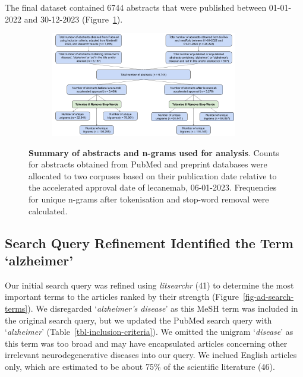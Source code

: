 \documentclass[
  a4paper,
]{article}
\begin{document}
The final dataset contained 6744 abstracts that were published between
01-01-2022 and 30-12-2023 (Figure~\ref{fig-results-summary}).

\begin{figure}

{\centering 

\begin{figure}[H]

{\centering \includegraphics[width=3.2in,height=\textheight]{data/resultsummary.png}

}

\end{figure}

}

\caption{\label{fig-results-summary}\textbf{Summary of abstracts and
n-grams used for analysis}. Counts for abstracts obtained from PubMed
and preprint databases were allocated to two corpuses based on their
publication date relative to the accelerated approval date of lecanemab,
06-01-2023. Frequencies for unique n-grams after tokenisation and
stop-word removal were calculated.}

\end{figure}

\hypertarget{search-query-refinement-identified-the-term-alzheimer}{%
\subsection{Search Query Refinement Identified the Term
`alzheimer'}\label{search-query-refinement-identified-the-term-alzheimer}}

Our initial search query was refined using \emph{litsearchr} (41) to
determine the most important terms to the articles ranked by their
strength (Figure~\ref{fig-ad-search-terms}). We disregarded
`\emph{alzheimer's disease}' as this MeSH term was included in the
original search query, but we updated the PubMed search query with
`\emph{alzheimer}' (Table~\ref{tbl-inclusion-criteria}). We omitted the
unigram `\emph{disease}' as this term was too broad and may have
encapsulated articles concerning other irrelevant neurodegenerative
diseases into our query. We inclued English articles only, which are
estimated to be about 75\% of the scientific literature (46).
\end{document}
